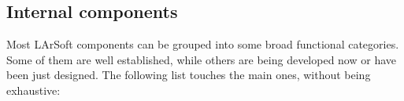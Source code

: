 \subsection{Internal components}
\label{ssec:Components:Internal}

Most LArSoft components can be grouped into some broad functional categories.
Some of them are well established, while others are being developed now or have been just designed.
The following list touches the main ones, without being exhaustive:
